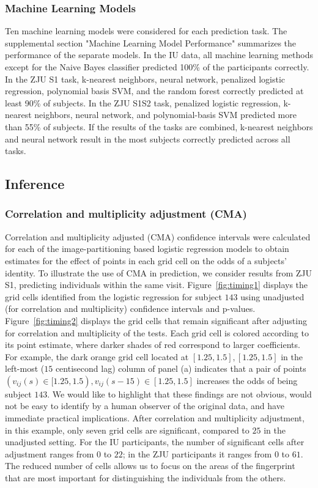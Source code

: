 \subsubsection{Machine Learning Models}\label{subsubsec:ML}
Ten machine learning models were considered for each prediction task. The supplemental section "Machine Learning Model Performance" summarizes the performance of the separate models. In the IU data, all machine learning methods except for the Naive Bayes classifier predicted 100\% of the participants correctly. In the ZJU S1 task, k-nearest neighbors, neural network, penalized logistic regression, polynomial basis SVM, and the random forest correctly predicted at least 90\% of subjects. In the ZJU S1S2 task, penalized logistic regression, k-nearest neighbors, neural network, and polynomial-basis SVM predicted more than 55\% of subjects. If the results of the tasks are combined, k-nearest neighbors and neural network result in the most subjects correctly predicted across all tasks.


\subsection{Inference} \label{subsec:inference}
\subsubsection{Correlation and multiplicity adjustment (CMA)}
Correlation and multiplicity adjusted (CMA) confidence intervals were calculated for each of the image-partitioning based logistic regression models to obtain estimates for the effect of points in each grid cell on the odds of a subjects' identity. To illustrate the use of CMA in prediction, we consider results from ZJU S1, predicting individuals within the same visit. Figure~\ref{fig:timing1} displays the grid cells identified from the logistic regression for subject $143$ using unadjusted (for correlation and multiplicity) confidence intervals and p-values. Figure~\ref{fig:timing2} displays the grid cells that remain significant after adjusting for  correlation and multiplicity of the tests. Each grid cell is colored according to its point estimate, where darker shades of red correspond to larger coefficients. For example, the dark orange grid cell located at $[1.25, 1.5], [1.25, 1.5]$ in the left-most ($15$ centisecond lag) column of panel (a) indicates that a pair of points $(v_{ij}(s) \in [1.25, 1.5), v_{ij}(s-15) \in [1.25, 1.5]$ increases the odds of being subject $143$. We would like to highlight that these findings are not obvious, would not be easy to identify by a human observer of the original data, and have immediate practical implications. After correlation and multiplicity adjustment, in this example, only seven grid cells are significant, compared to $25$ in the unadjusted setting. For the IU participants, the number of significant cells after adjustment ranges from $0$ to $22$; in the ZJU participants it ranges from $0$ to $61$. The reduced number of cells allows us to focus on the areas of the fingerprint that are most important for distinguishing the individuals from the others. 


